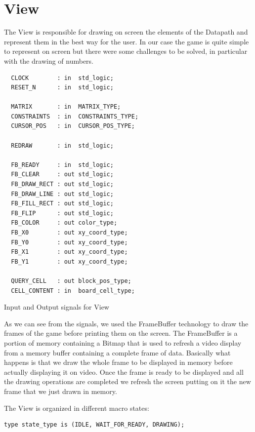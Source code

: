\documentclass[12pt]{report}
\begin{document}
\newpage

\section*{View}

The View is responsible for drawing on screen the elements of the Datapath
and represent them in the best way for the user. In our case the game is
quite simple to represent on screen but there were some challenges to be
solved, in particular with the drawing of numbers.

\begin{center}
\begin{minipage}{0.5\textwidth}
\begin{verbatim}
  CLOCK        : in  std_logic;
  RESET_N      : in  std_logic;

  MATRIX       : in  MATRIX_TYPE;
  CONSTRAINTS  : in  CONSTRAINTS_TYPE;
  CURSOR_POS   : in  CURSOR_POS_TYPE;

  REDRAW       : in  std_logic;

  FB_READY     : in  std_logic;
  FB_CLEAR     : out std_logic;
  FB_DRAW_RECT : out std_logic;
  FB_DRAW_LINE : out std_logic;
  FB_FILL_RECT : out std_logic;
  FB_FLIP      : out std_logic;
  FB_COLOR     : out color_type;
  FB_X0        : out xy_coord_type;
  FB_Y0        : out xy_coord_type;
  FB_X1        : out xy_coord_type;
  FB_Y1        : out xy_coord_type;

  QUERY_CELL   : out block_pos_type;
  CELL_CONTENT : in  board_cell_type;
\end{verbatim}
\caption{Input and Output signals for View}
\end{minipage}
\end{center}

As we can see from the signals, we used the FrameBuffer technology to draw
the frames of the game before printing them on the screen. The FrameBuffer
is a portion of memory containing a Bitmap that is used to refresh a video
display from a memory buffer containing a complete frame of data.
Basically what happens is that we draw the whole frame to be displayed in
memory before actually displaying it on video. Once the frame is ready to
be displayed and all the drawing operations are completed we refresh the
screen putting on it the new frame that we just drawn in memory.

\newpage

The View is organized in different macro states:

\begin{verbatim}
type state_type is (IDLE, WAIT_FOR_READY, DRAWING);
\end{verbatim}
\end{document}
